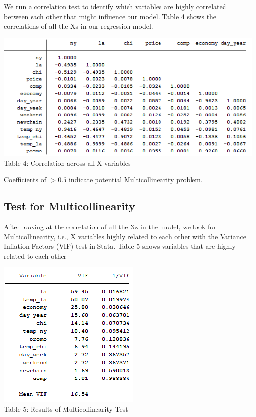 \documentclass[10pt]{article}
\begin{document}
We run a correlation test to identify which variables are highly correlated between each other that might influence our model. Table 4 shows the correlations of all the Xs in our regression model. 

\begin{center}
\includegraphics[scale=0.8]{g14.png}\\
Table 4: Correlation across all X variables
\end{center}

Coefficients of $>0.5$ indicate potential Multicollinearity problem.

\subsection{Test for Multicollinearity}

After looking at the correlation of all the Xs in the model, we look for Multicollinearity, i.e., X variables highly related to each other
with the Variance Inflation Factors (VIF) test in Stata. Table 5 shows variables that are highly related to each other

\begin{center}
\includegraphics[scale=0.8]{g13.png}\\
Table 5: Results of Multicollinearity Test
\end{center}
\end{document}
